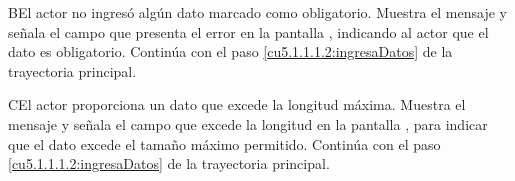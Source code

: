  \begin{UCtrayectoriaA}{B}{El actor no ingresó algún dato marcado como obligatorio.}
    \UCpaso[\UCsist] Muestra el mensaje  y señala el campo que presenta el error en la pantalla 
	    , indicando al actor que el dato es obligatorio.
    \UCpaso[] Continúa con el paso \ref{cu5.1.1.1.2:ingresaDatos} de la trayectoria principal.
 \end{UCtrayectoriaA}
 \begin{UCtrayectoriaA}{C}{El actor proporciona un dato que excede la longitud máxima.}
    \UCpaso[\UCsist] Muestra el mensaje  y señala el campo que excede la 
    longitud en la pantalla , para indicar que el dato excede el tamaño máximo permitido.
    \UCpaso[] Continúa con el paso \ref{cu5.1.1.1.2:ingresaDatos} de la trayectoria principal.
 \end{UCtrayectoriaA}

  